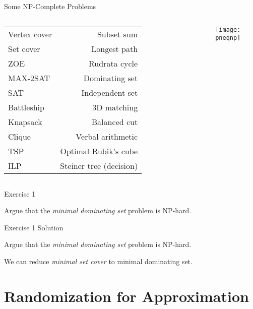 \documentclass[10pt]{beamer}
\begin{document}
\begin{frame}[fragile]{Some NP-Complete Problems}

\begin{columns}[T, onlytextwidth]
  \begin{table}
    \begin{tabular}{lr}
    \toprule
    Vertex cover & Subset sum \\
    Set cover & Longest path \\
    ZOE & Rudrata cycle \\
    MAX-2SAT & Dominating set \\
    SAT & Independent set \\
    Battleship & 3D matching \\
    Knapsack & Balanced cut \\
    Clique & Verbal arithmetic \\
    TSP & Optimal Rubik's cube \\
    ILP & Steiner tree (decision) \\
    \bottomrule
    \end{tabular}
  \end{table}

  \texttt{[image: pneqnp]}
\end{columns}

\end{frame}

\begin{frame}[fragile]{Exercise 1}

Argue that the \textit{minimal dominating set} problem is NP-hard.

\end{frame}

\begin{frame}[fragile]{Exercise 1 {\color{red} Solution}}

Argue that the \textit{minimal dominating set} problem is NP-hard.

{\color{red} We can reduce \textit{minimal set cover} to minimal dominating set.}

\end{frame}

\section{Randomization for Approximation}
\end{document}
